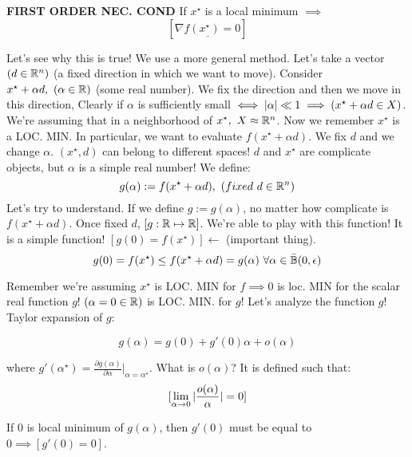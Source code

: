 \begin{thrm}{\textbf{FIRST ORDER NEC. COND}} \newline
If $x^\star$ is a local minimum $\implies$
\[
	[\underline{\nabla{f(x^\star)} = 0}]
\]
\end{thrm}

Let's see why this is true! We use a more general method. Let's take a vector $(d\in\mathbb{R}^n)$ (a fixed direction in which we want to move). Consider $x^\star + \alpha d,\ (\alpha\in\mathbb{R})$ (some real number). We fix the direction and then we move in this direction, Clearly if $\alpha$ is sufficiently small $\iff \lvert\alpha\rvert \ll 1 \implies (x^\star + \alpha d \in X)$.
We're assuming that in a neighborhood of $x^\star,\ X\approx \mathbb{R}^n$.
Now we remember $x^\star$ is a LOC. MIN. In particular, we want to evaluate $f(x^\star +\alpha d)$. We fix $d$ and we change $\alpha$. $(x^\star,d)$ can belong to different spaces! $d$ and $x^\star$ are complicate objects, but $\alpha$ is a simple real number! We define:
\[
	g(\alpha) := f(x^\star +\alpha d),\ (fixed\ d\in\R^n)
\]
Let's try to understand. If we define $g:=g(\alpha)$, no matter how complicate is $f(x^\star + \alpha d)$. Once fixed $d$, $[g:\mathbb{R}\mapsto\mathbb{R}]$. We're able to play with this function! It is a simple function! $[g(0)=f(x^\star)] \leftarrow$ (important thing).
\[
	g(0) = f(x^\star) \leq f(x^\star + \alpha d) = g(\alpha)\ \forall \alpha \in \bar{\mathbb{B}}(0,\epsilon)
\]	

Remember we're assuming $x^\star$ is LOC. MIN for $f \implies 0$ is loc. MIN for the scalar real function $g$! $(\alpha=0\in\mathbb{R})$ is LOC. MIN. for $g$! Let's analyze the function $g$!
Taylor expansion of $g$:

\[
	g(\alpha) = g(0) + g'(0)\alpha + o(\alpha)
\]	

where $g'(\alpha^\star) = \frac{\partial{g(\alpha)}}{\partial{\alpha}}|_{\alpha=\alpha^\star}$. What is $o(\alpha)$? It is defined such that:
\[
	[\lim_{\alpha\to 0}{\lvert\frac{o(\alpha)}{\alpha}\rvert} = 0]
\]

If 0 is local minimum of $g(\alpha)$, then $g'(0)$ must be equal to $0 \implies [g'(0)=0]$. 

